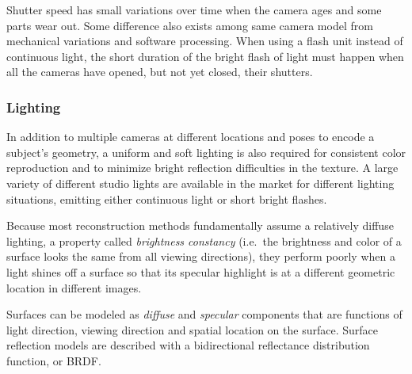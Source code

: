 Shutter speed has small variations over time when the camera ages and some parts wear out.
Some difference also exists among same camera model from mechanical variations and software processing.
When using a flash unit instead of continuous light, the short duration of the bright flash of light must happen when all the cameras have opened, but not yet closed, their shutters.



\subsubsection{Lighting} %

In addition to multiple cameras at different locations and poses to encode a subject's geometry, a uniform and soft lighting is also required for consistent color reproduction and to minimize bright reflection difficulties in the texture.
A large variety of different studio lights are available in the market for different lighting situations, emitting either continuous light or short bright flashes.

Because most reconstruction methods fundamentally assume a relatively diffuse lighting, a property called \emph{brightness constancy} (i.e.\ the brightness and color of a surface looks the same from all viewing directions), they perform poorly when a light shines off a surface so that its specular highlight is at a different geometric location in different images.


Surfaces can be modeled as \emph{diffuse} and \emph{specular} components that are functions of light direction, viewing direction and spatial location on the surface.
Surface reflection models are described with a bidirectional reflectance distribution function, or BRDF. \cite{nicodemus1965dirreflectanceetc}

